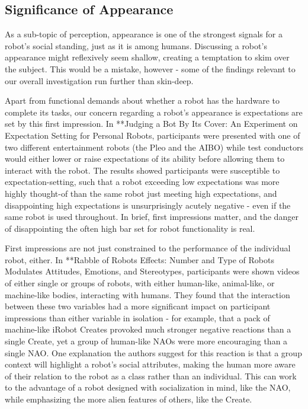 \documentclass{sfuthesis}
\begin{document}



\subsection{Significance of Appearance}

As a sub-topic of perception, appearance is one of the strongest signals for a robot's social standing, just as it is among humans. Discussing a robot's appearance might reflexively seem shallow, creating a temptation to skim over the subject. This would be a mistake, however - some of the findings relevant to our overall investigation run further than skin-deep.

Apart from functional demands about whether a robot has the hardware to complete its tasks, our concern regarding a robot's appearance is expectations are set by this first impression. In **Judging a Bot By Its Cover: An Experiment on Expectation Setting for Personal Robots,	participants were presented with one of two different entertainment robots (the Pleo and the AIBO) while test conductors would either lower or raise expectations of its ability before allowing them to interact with the robot. The results showed participants were susceptible to expectation-setting, such that a robot exceeding low expectations was more highly thought-of than the same robot just meeting high expectations, and disappointing high expectations is unsurprisingly acutely negative - even if the same robot is used throughout. In brief, first impressions matter, and the danger of disappointing the often high bar set for robot functionality is real.

First impressions are not just constrained to the performance of the individual robot, either. In **Rabble of Robots Effects: Number and Type of Robots Modulates Attitudes, Emotions, and Stereotypes, participants were shown videos of either single or groups of robots, with either human-like, animal-like, or machine-like bodies, interacting with humans. They found that the interaction between these two variables had a more significant impact on participant impressions than either variable in isolation - for example, that a pack of machine-like iRobot Creates provoked much stronger negative reactions than a single Create, yet a group of human-like NAOs were more encouraging than a single NAO. One explanation the authors suggest for this reaction is that a group context will highlight a robot's social attributes, making the human more aware of their relation to the robot as a class rather than an individual. This can work to the advantage of a robot designed with socialization in mind, like the NAO, while emphasizing the more alien features of others, like the Create.
\end{document}
